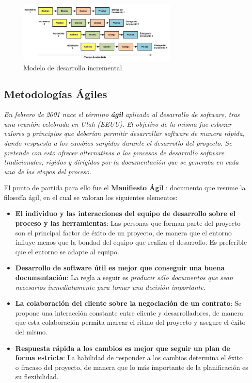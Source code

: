 \begin{itemize}
    \begin{figure}[H]
        \centering
        \includegraphics[width=8cm]{Figures/modelo_incremental.png}
        \caption{Modelo de desarrollo incremental \autocite*{Alarcon2016}}
    \end{figure}
\end{itemize}

\subsection{Metodologías Ágiles}
\textit{En febrero de 2001 nace el término \textbf{ágil} aplicado al desarrollo de software, tras una reunión celebrada en 
\textnormal{Utah (EEUU)}. El objetivo de la misma fue esbozar valores y principios que deberían permitir desarrollar 
software de manera rápida, dando respuesta a los cambios surgidos durante el desarrollo del proyecto. Se pretende 
con esto ofrecer alternativas a los procesos de desarrollo software tradicionales, rígidos y dirigidos por la documentación 
que se generaba en cada una de las etapas del proceso.} \autocite*{AmayaBalaguera2015} \medskip

El punto de partida para ello fue el \textbf{Manifiesto Ágil} \autocite*{Beck2001}: 
documento que resume la filosofía ágil, en el cual se valoran los siguientes elementos:
\begin{itemize}
    \item \textbf{El individuo y las interacciones del equipo de desarrollo sobre el proceso y las herramientas}:
    Las personas que forman parte del proyecto son el principal factor de éxito de un proyecto, de manera que el entorno
    influye menos que la bondad del equipo que realiza el desarrollo. Es preferible que el entorno se adapte al equipo.

    \item \textbf{Desarrollo de software útil es mejor que conseguir una buena documentación}:
    La regla a seguir es \textit{producir sólo documentos que sean necesarios inmediatamente para tomar una 
    decisión importante}.

    \item \textbf{La colaboración del cliente sobre la negociación de un contrato}: Se propone una interacción 
    constante entre cliente y desarrolladores, de manera que esta colaboración permita marcar el ritmo del 
    proyecto y asegure el éxito del mismo.

    \item \textbf{Respuesta rápida a los cambios es mejor que seguir un plan de forma estricta}:
    La habilidad de responder a los cambios determina el éxito o fracaso del proyecto, de manera que lo
    más importante de la planificación es su flexibilidad.
\end{itemize} 

